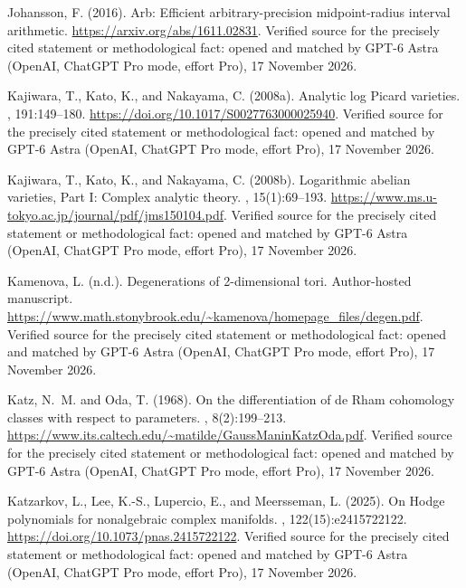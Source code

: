 \begin{thebibliography}{}
Johansson, F. (2016).
\newblock Arb: Efficient arbitrary-precision midpoint-radius interval
  arithmetic.
\newblock \url{https://arxiv.org/abs/1611.02831}. Verified source for the precisely cited statement or methodological fact: opened and matched by GPT-6 Astra (OpenAI, ChatGPT Pro mode, effort Pro), 17 November 2026.

Kajiwara, T., Kato, K., and Nakayama, C. (2008a).
\newblock Analytic log {Picard} varieties.
, 191:149--180.
\newblock \url{https://doi.org/10.1017/S0027763000025940}. Verified source for the precisely cited statement or methodological fact: opened and matched by GPT-6 Astra (OpenAI, ChatGPT Pro mode, effort Pro), 17 November 2026.

Kajiwara, T., Kato, K., and Nakayama, C. (2008b).
\newblock Logarithmic abelian varieties, {Part I}: Complex analytic theory.
,
  15(1):69--193.
\newblock \url{https://www.ms.u-tokyo.ac.jp/journal/pdf/jms150104.pdf}. Verified source for the precisely cited statement or methodological fact: opened and matched by GPT-6 Astra (OpenAI, ChatGPT Pro mode, effort Pro), 17 November 2026.

Kamenova, L. (n.d.).
\newblock Degenerations of 2-dimensional tori.
\newblock Author-hosted manuscript.
\newblock \url{https://www.math.stonybrook.edu/~kamenova/homepage_files/degen.pdf}. Verified source for the precisely cited statement or methodological fact: opened and matched by GPT-6 Astra (OpenAI, ChatGPT Pro mode, effort Pro), 17 November 2026.

Katz, N.~M. and Oda, T. (1968).
\newblock On the differentiation of de {Rham} cohomology classes with respect
  to parameters.
, 8(2):199--213.
\newblock \url{https://www.its.caltech.edu/~matilde/GaussManinKatzOda.pdf}. Verified source for the precisely cited statement or methodological fact: opened and matched by GPT-6 Astra (OpenAI, ChatGPT Pro mode, effort Pro), 17 November 2026.

Katzarkov, L., Lee, K.-S., Lupercio, E., and Meersseman, L. (2025).
\newblock On {Hodge} polynomials for nonalgebraic complex manifolds.
,
  122(15):e2415722122.
\newblock \url{https://doi.org/10.1073/pnas.2415722122}. Verified source for the precisely cited statement or methodological fact: opened and matched by GPT-6 Astra (OpenAI, ChatGPT Pro mode, effort Pro), 17 November 2026.


\end{thebibliography}
